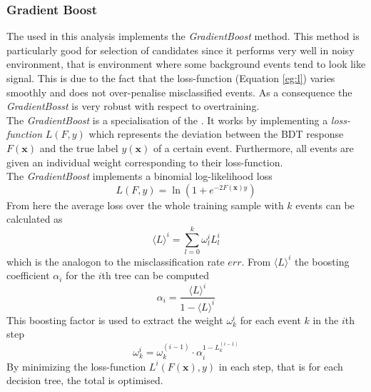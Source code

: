 \subsubsection{Gradient Boost}
The \bdtn used in this analysis implements the \textit{GradientBoost} method. This method is particularly good for selection of \BdKstee candidates since it performs very well in noisy environment, that is environment where some background events tend to look like signal. This is due to the fact that the loss-function (Equation \ref{eg:l}) varies smoothly and does not over-penalise misclassified events. As a consequence the \textit{GradientBosst} is very robust with respect to overtraining.\\
The \textit{GradientBoost} is a specialisation of the \bdtn. It works by implementing a \textit{loss-function} $L(F,y)$ which represents the deviation between the BDT response $F(\mathbf{x})$ and the true label $y(\mathbf{x})$ of a certain event. Furthermore, all events are given an individual weight corresponding to their loss-function. \\
The \textit{GradientBoost} implements a binomial log-likelihood loss
\begin{equation}
L(F,y) = \ln(1+e^{-2F(\mathbf{x})y})
\end{equation}
From here the average loss over the whole training sample with $k$ events can be calculated as
\begin{equation}
\langle L \rangle^{i} = \sum_{l=0}^k \omega^i_l L^i_l 
\label{eg:l}
\end{equation}
which is the analogon to the misclassification rate $err$. From $\langle L \rangle^{i}$ the boosting coefficient $\alpha_i$ for the $i$th tree can be computed
\begin{equation}
\alpha_i = \frac{\langle L \rangle^{i}}{1-\langle L \rangle^{i}}
\end{equation}
This boosting factor is used to extract the weight $\omega^i_k$ for each event $k$ in the $i$th step
\begin{equation}
\omega^i_k = \omega^{(i-1)}_k \cdot \alpha_i^{1-L^{(i-1)}_k}
\end{equation}
By minimizing the loss-function $ L^i(F(\mathbf{x}), y) $ in each step, that is for each decision tree, the total \bdtn is optimised.\\

